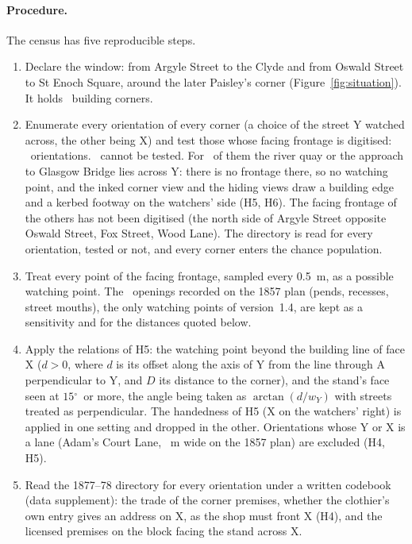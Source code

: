 \documentclass[10pt,a4paper]{article}
\newcommand{\degree}{$^\circ$}
\begin{document}
\paragraph{Procedure.} The census has five reproducible steps.
\begin{enumerate}
\item Declare the window: from Argyle Street to the Clyde and from Oswald Street to St Enoch Square, around the later Paisley's corner (Figure~\ref{fig:situation}). It holds \nPhysicalWindow\ building corners.
\item Enumerate every orientation of every corner (a choice of the street Y watched across, the other being X) and test those whose facing frontage is digitised: \nOrient\ orientations. \nUntested\ cannot be tested. For \nUntestedQuay\ of them the river quay or the approach to Glasgow Bridge lies across Y: there is no frontage there, so no watching point, and the inked corner view and the hiding views draw a building edge and a kerbed footway on the watchers' side (H5, H6). The facing frontage of the others has not been digitised (the north side of Argyle Street opposite Oswald Street, Fox Street, Wood Lane). The directory is read for every orientation, tested or not, and every corner enters the chance population.
\item Treat every point of the facing frontage, sampled every 0.5~m, as a possible watching point. The \nOpenings\ openings recorded on the 1857 plan (pends, recesses, street mouths), the only watching points of version~1.4, are kept as a sensitivity and for the distances quoted below.
\item Apply the relations of H5: the watching point beyond the building line of face X ($d>0$, where $d$ is its offset along the axis of Y from the line through A perpendicular to Y, and $D$ its distance to the corner), and the stand's face seen at $15$\degree\ or more, the angle being taken as $\arctan(d/w_Y)$ with streets treated as perpendicular. The handedness of H5 (X on the watchers' right) is applied in one setting and dropped in the other. Orientations whose Y or X is a lane (Adam's Court Lane, \WidthACL~m wide on the 1857 plan) are excluded (H4, H5).
\item Read the 1877--78 directory for every orientation under a written codebook (data supplement): the trade of the corner premises, whether the clothier's own entry gives an address on X, as the shop must front X (H4), and the licensed premises on the block facing the stand across X.
\end{enumerate}
\end{document}
